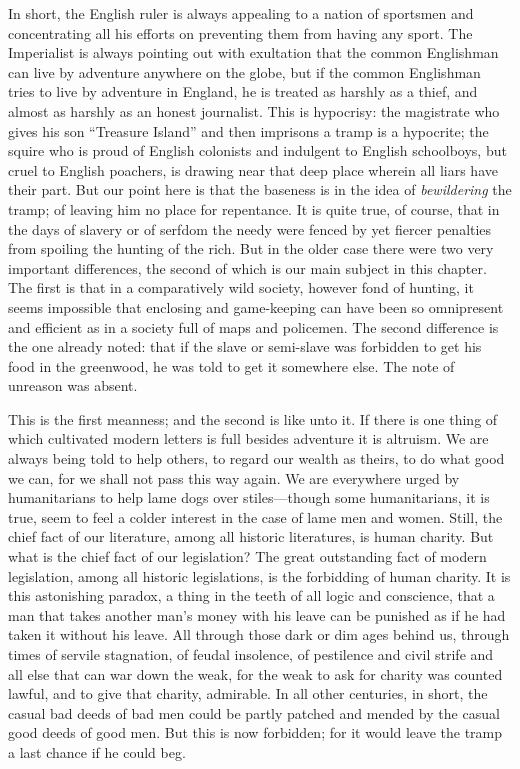 \documentclass{book}
\begin{document}
In short, the English ruler is always appealing to a nation of sportsmen and concentrating all his efforts on preventing them from having any sport. The Imperialist is always pointing out with exultation that the common Englishman can live by adventure anywhere on the globe, but if the common Englishman tries to live by adventure in England, he is treated as harshly as a thief, and almost as harshly as an honest journalist. This is hypocrisy: the magistrate who gives his son “Treasure Island” and then imprisons a tramp is a hypocrite; the squire who is proud of English colonists and indulgent to English schoolboys, but cruel to English poachers, is drawing near that deep place wherein all liars have their part. But our point here is that the baseness is in the idea of \emph{bewildering} the tramp; of leaving him no place for repentance. It is quite true, of course, that in the days of slavery or of serfdom the needy were fenced by yet fiercer penalties from spoiling the hunting of the rich. But in the older case there were two very important differences, the second of which is our main subject in this chapter. The first is that in a comparatively wild society, however fond of hunting, it seems impossible that enclosing and game-keeping can have been so omnipresent and efficient as in a society full of maps and policemen. The second difference is the one already noted: that if the slave or semi-slave was forbidden to get his food in the greenwood, he was told to get it somewhere else. The note of unreason was absent.

This is the first meanness; and the second is like unto it. If there is one thing of which cultivated modern letters is full besides adventure it is altruism. We are always being told to help others, to regard our wealth as theirs, to do what good we can, for we shall not pass this way again. We are everywhere urged by humanitarians to help lame dogs over stiles—though some humanitarians, it is true, seem to feel a colder interest in the case of lame men and women. Still, the chief fact of our literature, among all historic literatures, is human charity. But what is the chief fact of our legislation? The great outstanding fact of modern legislation, among all historic legislations, is the forbidding of human charity. It is this astonishing paradox, a thing in the teeth of all logic and conscience, that a man that takes another man’s money with his leave can be punished as if he had taken it without his leave. All through those dark or dim ages behind us, through times of servile stagnation, of feudal insolence, of pestilence and civil strife and all else that can war down the weak, for the weak to ask for charity was counted lawful, and to give that charity, admirable. In all other centuries, in short, the casual bad deeds of bad men could be partly patched and mended by the casual good deeds of good men. But this is now forbidden; for it would leave the tramp a last chance if he could beg.
\end{document}
